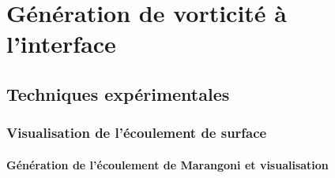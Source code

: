 \part{Génération de vorticité à l'interface}

\chapter{Techniques expérimentales}

\section{Visualisation de l'écoulement de surface}\label{section:Visualisation}

\subsection{Génération de l'écoulement de Marangoni et visualisation}

